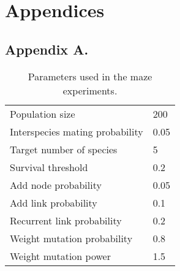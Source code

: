 \newpage
\section*{Appendices}

\subsection*{Appendix A.}
\setcounter{table}{0}
\renewcommand{\thetable}{A\arabic{table}}
\begin{table}[H]
    \centering
    \begin{tabular}{ll}
    \toprule
    Population size & 200\\
    Interspecies mating probability &  0.05\\
    Target number of species & 5\\
    Survival threshold & 0.2\\
    Add node probability &  0.05\\
    Add link probability &  0.1\\
    Recurrent link probability &  0.2\\
    Weight mutation probability &  0.8\\
    Weight mutation power &  1.5\\
    \bottomrule
    \end{tabular}
    \captionsetup{justification=centering}
    \caption{Parameters used in the maze experiments.}
\end{table}
